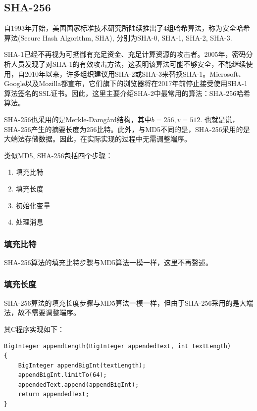 \subsection{SHA-256}
自1993年开始，美国国家标准技术研究所陆续推出了4组哈希算法，称为安全哈希算法(Secure Hash Algorithm, SHA), 分别为SHA-0, SHA-1, SHA-2, SHA-3.\par
SHA-1已经不再视为可抵御有充足资金、充足计算资源的攻击者。2005年，密码分析人员发现了对SHA-1的有效攻击方法，这表明该算法可能不够安全，不能继续使用，自2010年以来，许多组织建议用SHA-2或SHA-3来替换SHA-1。Microsoft、Google以及Mozilla都宣布，它们旗下的浏览器将在2017年前停止接受使用SHA-1算法签名的SSL证书。因此，这里主要介绍SHA-2中最常用的算法：SHA-256哈希算法。\par
SHA-256也采用的是Merkle-Damg\aa rd结构，其中$b=256, v=512$. 也就是说，SHA-256产生的摘要长度为256比特。此外，与MD5不同的是，SHA-256采用的是大端法存储数据。因此，在实际实现的过程中无需调整端序。\par
类似MD5, SHA-256包括四个步骤：
\begin{enumerate}
    \item 填充比特
    \item 填充长度
    \item 初始化变量
    \item 处理消息
\end{enumerate}
\subsubsection{填充比特}
SHA-256算法的填充比特步骤与MD5算法一模一样，这里不再赘述。
\subsubsection{填充长度}
SHA-256算法的填充长度步骤与MD5算法一模一样，但由于SHA-256采用的是大端法，故不需要调整端序。\par
其C程序实现如下：
\begin{prove}
\begin{verbatim}
BigInteger appendLength(BigInteger appendedText, int textLength)
{
    BigInteger appendBigInt(textLength);
    appendBigInt.limitTo(64);
    appendedText.append(appendBigInt);
    return appendedText;
}
\end{verbatim}
\end{prove}
